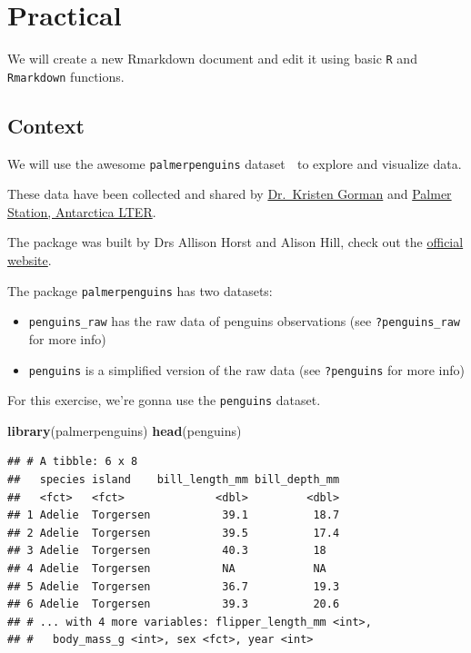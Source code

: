 \documentclass[
  12pt,
]{book}
\newenvironment{Shaded}{\begin{snugshade}}{\end{snugshade}}
\newcommand{\KeywordTok}[1]{\textcolor[rgb]{0.13,0.29,0.53}{\textbf{#1}}}
\newcommand{\NormalTok}[1]{#1}
\providecommand{\tightlist}{%
  \setlength{\itemsep}{0pt}\setlength{\parskip}{0pt}}
\begin{document}
\hypertarget{practical}{%
\section{Practical}\label{practical}}

We will create a new Rmarkdown document and edit it using basic \texttt{R} and \texttt{Rmarkdown} functions.

\hypertarget{context}{%
\subsection{Context}\label{context}}

We will use the awesome \texttt{palmerpenguins} dataset 🐧 to explore and visualize data.

These data have been collected and shared by \href{https://www.uaf.edu/cfos/people/faculty/detail/kristen-gorman.php}{Dr.~Kristen Gorman} and \href{https://pal.lternet.edu/}{Palmer Station, Antarctica LTER}.

The package was built by Drs Allison Horst and Alison Hill, check out the \href{https://allisonhorst.github.io/palmerpenguins/}{official website}.

The package \texttt{palmerpenguins} has two datasets:

\begin{itemize}
\tightlist
\item
  \texttt{penguins\_raw} has the raw data of penguins observations (see \texttt{?penguins\_raw} for more info)
\item
  \texttt{penguins} is a simplified version of the raw data (see \texttt{?penguins} for more info)
\end{itemize}

For this exercise, we're gonna use the \texttt{penguins} dataset.

\begin{Shaded}
\begin{Highlighting}[]
\KeywordTok{library}\NormalTok{(palmerpenguins)}
\KeywordTok{head}\NormalTok{(penguins)}
\end{Highlighting}
\end{Shaded}

\begin{verbatim}
## # A tibble: 6 x 8
##   species island    bill_length_mm bill_depth_mm
##   <fct>   <fct>              <dbl>         <dbl>
## 1 Adelie  Torgersen           39.1          18.7
## 2 Adelie  Torgersen           39.5          17.4
## 3 Adelie  Torgersen           40.3          18  
## 4 Adelie  Torgersen           NA            NA  
## 5 Adelie  Torgersen           36.7          19.3
## 6 Adelie  Torgersen           39.3          20.6
## # ... with 4 more variables: flipper_length_mm <int>,
## #   body_mass_g <int>, sex <fct>, year <int>
\end{verbatim}
\end{document}

